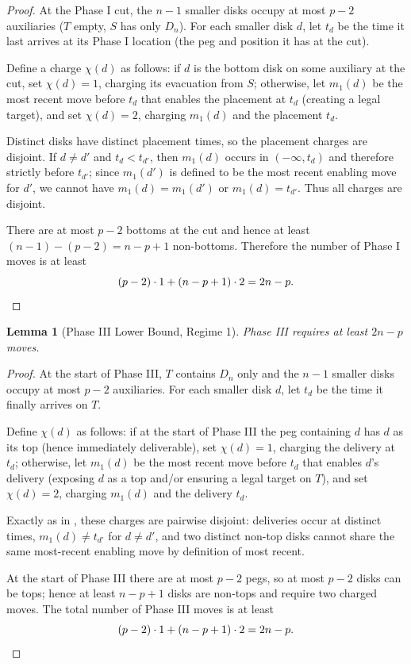 \documentclass[11pt]{article}
\newtheorem{lemma}[theorem]{Lemma}
\theoremstyle{definition}
\begin{document}
\begin{proof}
At the Phase I cut, the $n-1$ smaller disks occupy at most $p-2$ auxiliaries ($T$ empty, $S$ has only $D_n$). For each smaller disk $d$, let $t_d$ be the time it last arrives at its Phase I location (the peg and position it has at the cut).

Define a charge $\chi(d)$ as follows: if $d$ is the bottom disk on some auxiliary at the cut, set $\chi(d) = 1$, charging its evacuation from $S$; otherwise, let $m_1(d)$ be the most recent move before $t_d$ that enables the placement at $t_d$ (creating a legal target), and set $\chi(d) = 2$, charging $m_1(d)$ and the placement $t_d$.

Distinct disks have distinct placement times, so the placement charges are disjoint. If $d \neq d'$ and $t_d < t_{d'}$, then $m_1(d)$ occurs in $(-\infty, t_d)$ and therefore strictly before $t_{d'}$; since $m_1(d')$ is defined to be the most recent enabling move for $d'$, we cannot have $m_1(d) = m_1(d')$ or $m_1(d) = t_{d'}$. Thus all charges are disjoint.

There are at most $p-2$ bottoms at the cut and hence at least $(n-1) - (p-2) = n - p + 1$ non-bottoms. Therefore the number of Phase I moves is at least
\[
(p-2) \cdot 1 + (n-p+1) \cdot 2 = 2n - p. \qedhere
\]
\end{proof}

\begin{lemma}[Phase III Lower Bound, Regime 1]\label{lem:phase3-lower}
Phase III requires at least $2n-p$ moves.
\end{lemma}

\begin{proof}
At the start of Phase III, $T$ contains $D_n$ only and the $n-1$ smaller disks occupy at most $p-2$ auxiliaries. For each smaller disk $d$, let $t_d$ be the time it finally arrives on $T$.

Define $\chi(d)$ as follows: if at the start of Phase III the peg containing $d$ has $d$ as its top (hence immediately deliverable), set $\chi(d) = 1$, charging the delivery at $t_d$; otherwise, let $m_1(d)$ be the most recent move before $t_d$ that enables $d$'s delivery (exposing $d$ as a top and/or ensuring a legal target on $T$), and set $\chi(d) = 2$, charging $m_1(d)$ and the delivery $t_d$.

Exactly as in , these charges are pairwise disjoint: deliveries occur at distinct times, $m_1(d) \neq t_{d'}$ for $d \neq d'$, and two distinct non-top disks cannot share the same most-recent enabling move by definition of most recent.

At the start of Phase III there are at most $p-2$ pegs, so at most $p-2$ disks can be tops; hence at least $n - p + 1$ disks are non-tops and require two charged moves. The total number of Phase III moves is at least
\[
(p-2) \cdot 1 + (n-p+1) \cdot 2 = 2n - p. \qedhere
\]
\end{proof}
\end{document}
